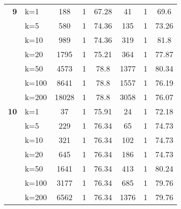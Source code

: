\begin{table}[htbp]
\begin{tabular}{|l|l|c|c|c|c|c|c|}
    \multicolumn{1}{|r|}{\textbf{9}} & k=1 & 188 & 1 & 67.28 & 41 & 1 & 69.6 \\ 
     & k=5 & 580 & 1 & 74.36 & 135 & 1 & 73.26 \\ 
     & k=10 & 989 & 1 & 74.36 & 319 & 1 & 81.8 \\ 
     & k=20 & 1795 & 1 & 75.21 & 364 & 1 & 77.87 \\ 
     & k=50 & 4573 & 1 & 78.8 & 1377 & 1 & 80.34 \\ 
     & k=100 & 8641 & 1 & 78.8 & 1557 & 1 & 76.19 \\ 
     & k=200 & 18028 & 1 & 78.8 & 3058 & 1 & 76.07 \\ \hline
    \multicolumn{1}{|r|}{\textbf{10}} & k=1 & 37 & 1 & 75.91 & 24 & 1 & 72.18 \\ 
     & k=5 & 229 & 1 & 76.34 & 65 & 1 & 74.73 \\ 
     & k=10 & 321 & 1 & 76.34 & 102 & 1 & 74.73 \\ 
     & k=20 & 645 & 1 & 76.34 & 186 & 1 & 74.73 \\ 
     & k=50 & 1641 & 1 & 76.34 & 413 & 1 & 80.24 \\ 
     & k=100 & 3177 & 1 & 76.34 & 685 & 1 & 79.76 \\ 
     & k=200 & 6562 & 1 & 76.34 & 1376 & 1 & 79.76 \\ \hline
    \end{tabular}
\end{table}
